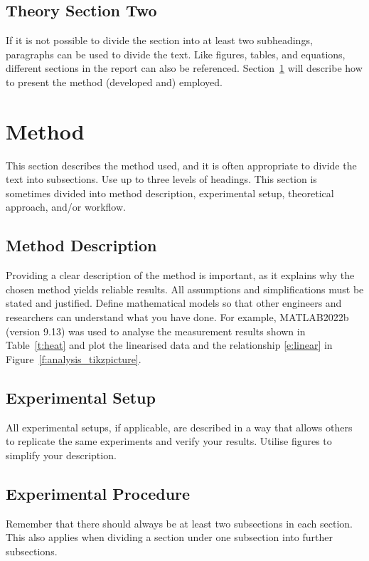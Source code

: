\documentclass[a4paper]{article}
\begin{document}
\subsection{Theory Section Two}\label{s:theorysection2}
If it is not possible to divide the section into at least two subheadings, paragraphs can be used to divide the text. Like figures, tables, and equations, different sections in the report can also be referenced. Section~\ref{s:method} will describe how to present the method (developed and) employed.

\newpage
\section{Method}\label{s:method}

This section describes the method used, and it is often appropriate to divide the text into subsections. Use up to three levels of headings.
This section is sometimes divided into method description, experimental setup, theoretical approach, and/or workflow.

\subsection{Method Description}
Providing a clear description of the method is important, as it explains why the chosen method yields reliable results. All assumptions and simplifications must be stated and justified. Define mathematical models so that other engineers and researchers can understand what you have done.
For example, MATLAB2022b (version 9.13) \cite{MATLAB2022} was used to analyse the measurement results shown in Table~\ref{t:heat} and plot the linearised data and the relationship \eqref{e:linear} in Figure~\ref{f:analysis_tikzpicture}.

\subsection{Experimental Setup}

All experimental setups, if applicable, are described in a way that allows others to replicate the same experiments and verify your results. Utilise figures to simplify your description.

\subsection{Experimental Procedure}
Remember that there should always be at least two subsections in each section. This also applies when dividing a section under one subsection into further subsections.
\end{document}
